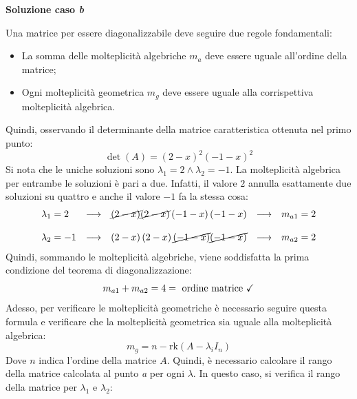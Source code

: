 \documentclass[a4paper]{article}
\begin{document}
	\noindent
	\textcolor{Green4}{\textbf{Soluzione caso \emph{b}}}\newline
	
	\noindent
	Una matrice per essere diagonalizzabile deve seguire due regole fondamentali:
	\begin{itemize}
		\item La somma delle molteplicità algebriche $m_{a}$ deve essere uguale all'ordine della matrice;
		\item Ogni molteplicità geometrica $m_{g}$ deve essere uguale alla corrispettiva molteplicità algebrica.
	\end{itemize}
	Quindi, osservando il determinante della matrice caratteristica ottenuta nel primo punto:
	\begin{equation*}
		\det\left(A\right) = \left(2-x\right)^{2}\left(-1-x\right)^{2}
	\end{equation*}
	Si nota che le uniche soluzioni sono $\lambda_{1} = 2 \land \lambda_{2} = -1$. La molteplicità algebrica per entrambe le soluzioni è pari a due. Infatti, il valore $2$ annulla esattamente due soluzioni su quattro e anche il valore $-1$ fa la stessa cosa:
	\begin{equation*}
		\begin{array}{lllll}
			\lambda_{1} = 2 & \longrightarrow & \cancel{\left(2-x\right)} \cancel{\left(2-x\right)} \left(-1-x\right) \left(-1-x\right) & \longrightarrow & m_{a1} = 2 \\
			\\
			\lambda_{2} = -1 & \longrightarrow & \left(2-x\right) \left(2-x\right) \cancel{\left(-1-x\right)} \cancel{\left(-1-x\right)} & \longrightarrow & m_{a2} = 2
		\end{array}
	\end{equation*}
	Quindi, sommando le molteplicità algebriche, viene soddisfatta la prima condizione del teorema di diagonalizzazione:
	\begin{equation*}
		m_{a1} + m_{a2} = 4 = \text{ ordine matrice \checkmark}
	\end{equation*}
	Adesso, per verificare le molteplicità geometriche è necessario seguire questa formula e verificare che la molteplicità geometrica sia uguale alla molteplicità algebrica:
	\begin{equation*}
		m_{g} = n - \mathrm{rk}\left(A - \lambda_{i}I_{n}\right)
	\end{equation*}
	Dove $n$ indica l'ordine della matrice $A$. Quindi, è necessario calcolare il rango della matrice calcolata al punto \emph{a} per ogni $\lambda$. In questo caso, si verifica il rango della matrice per $\lambda_{1}$ e $\lambda_{2}$:
\end{document}
